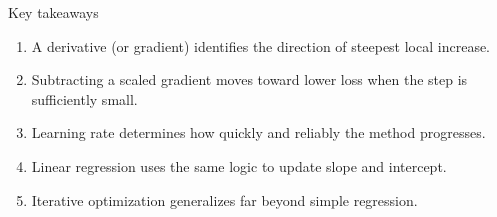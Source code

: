 \documentclass[aspectratio=169,11pt]{beamer}
\begin{document}
\begin{frame}{Key takeaways}
\begin{enumerate}
\item A derivative (or gradient) identifies the direction of steepest local increase.
\item Subtracting a scaled gradient moves toward lower loss when the step is sufficiently small.
\item Learning rate determines how quickly and reliably the method progresses.
\item Linear regression uses the same logic to update slope and intercept.
\item Iterative optimization generalizes far beyond simple regression.
\end{enumerate}
\end{frame}
\end{document}

